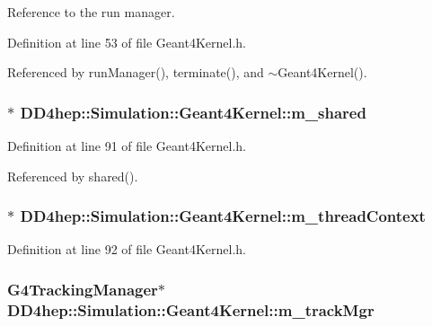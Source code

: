 Reference to the run manager. 

Definition at line 53 of file Geant4Kernel.h.

Referenced by runManager(), terminate(), and $\sim$Geant4Kernel().\hypertarget{class_d_d4hep_1_1_simulation_1_1_geant4_kernel_a47da20469676a2497cbf580428984362}{
\subsubsection[{m\_\-shared}]{$\ast$ {\bf DD4hep::Simulation::Geant4Kernel::m\_\-shared}}}
\label{class_d_d4hep_1_1_simulation_1_1_geant4_kernel_a47da20469676a2497cbf580428984362}


Definition at line 91 of file Geant4Kernel.h.

Referenced by shared().\hypertarget{class_d_d4hep_1_1_simulation_1_1_geant4_kernel_a774c57eb5d21094d0ecca5db90f24998}{
\subsubsection[{m\_\-threadContext}]{$\ast$ {\bf DD4hep::Simulation::Geant4Kernel::m\_\-threadContext}}}
\label{class_d_d4hep_1_1_simulation_1_1_geant4_kernel_a774c57eb5d21094d0ecca5db90f24998}


Definition at line 92 of file Geant4Kernel.h.\hypertarget{class_d_d4hep_1_1_simulation_1_1_geant4_kernel_a4bd577a1215149f49a745aa75b652565}{
\subsubsection[{m\_\-trackMgr}]{\setlength{\rightskip}{0pt plus 5cm}G4TrackingManager$\ast$ {\bf DD4hep::Simulation::Geant4Kernel::m\_\-trackMgr}}}
\label{class_d_d4hep_1_1_simulation_1_1_geant4_kernel_a4bd577a1215149f49a745aa75b652565}


